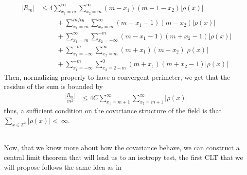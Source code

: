 \documentclass[12pt]{article}
\theoremstyle{Theorem}
\begin{document}
\begin{align*}
|R_{m}| & \leq 4\sum_{x_{\scriptscriptstyle 1} = m}^{\infty}\sum_{x_{\scriptscriptstyle 2}= m}^{\infty}\left(m - x_{1}\right)\left(m - 1- x_{2}\right)|\rho(x)| \\
& \hspace{1cm}+ \sum_{x_1 = m}^{infty} \sum_{x_2=m}^{\infty}\left(m-x_1-1\right)\left(m-x_2\right)|\rho(x)| \\
& \hspace{1cm}+ \sum_{x_1 = m}^\infty \sum_{x_2= -\infty}^{\scriptscriptstyle -m}\left(m-x_1-1\right)\left(m+x_2-1\right)|\rho(x)|\\
& \hspace{1cm}+ \sum_{x_1 = -\infty}^{-m} \sum_{x_2=m}^{\infty}\left(m+x_1\right)\left(m-x_2\right)|\rho(x)|\\
& \hspace{1cm}+ \sum_{x_1 = -\infty}^{-m} \sum_{x_2=2-m}^{\scriptscriptstyle 0}\left(m+x_1\right)\left(m+x_2-1\right)|\rho(x)|
\end{align*}
Then, normalizing properly to have a convergent perimeter, we get that the residue of the sum is bounded by  
\begin{align*}
\frac{|R_{m}|}{m^2} & \leq 4C\sum_{x_{\scriptscriptstyle 1} = m+1}^{\infty}\sum_{x_{\scriptscriptstyle 2}= m+1}^{\infty}|\rho(x)| 
\end{align*}
thus, a sufficient condition on the covariance structure of the field is that~$\sum_{x \in \mathbb{Z}^{2}} |\rho(x)| <~\infty$.

~\\
Now, that we know more about how the covariance behave, we can construct a central limit theorem that will lead us to an isotropy test, the first CLT that we will propose follows the same idea as in \cite{Psymetrie}
\vspace{-0.5cm}{}
\end{document}
